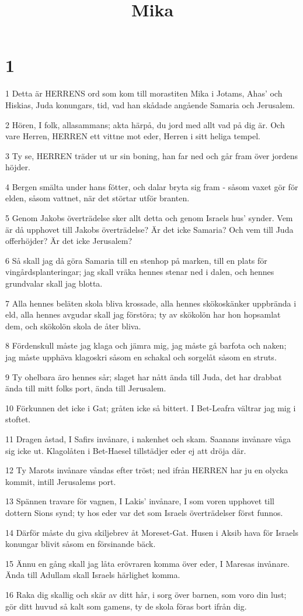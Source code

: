 

\title{Mika}


\chapter{1}

\par 1 Detta är HERRENS ord som kom till morastiten Mika i Jotams, Ahas' och Hiskias, Juda konungars, tid, vad han skådade angående Samaria och Jerusalem.
\par 2 Hören, I folk, allasammans; akta härpå, du jord med allt vad på dig är. Och vare Herren, HERREN ett vittne mot eder, Herren i sitt heliga tempel.
\par 3 Ty se, HERREN träder ut ur sin boning, han far ned och går fram över jordens höjder.
\par 4 Bergen smälta under hans fötter, och dalar bryta sig fram - såsom vaxet gör för elden, såsom vattnet, när det störtar utför branten.
\par 5 Genom Jakobs överträdelse sker allt detta och genom Israels hus' synder. Vem är då upphovet till Jakobs överträdelse? Är det icke Samaria? Och vem till Juda offerhöjder? Är det icke Jerusalem?
\par 6 Så skall jag då göra Samaria till en stenhop på marken, till en plats för vingårdsplanteringar; jag skall vräka hennes stenar ned i dalen, och hennes grundvalar skall jag blotta.
\par 7 Alla hennes beläten skola bliva krossade, alla hennes skökoskänker uppbrända i eld, alla hennes avgudar skall jag förstöra; ty av skökolön har hon hopsamlat dem, och skökolön skola de åter bliva.
\par 8 Fördenskull måste jag klaga och jämra mig, jag måste gå barfota och naken; jag måste upphäva klagoskri såsom en schakal och sorgelåt såsom en struts.
\par 9 Ty ohelbara äro hennes sår; slaget har nått ända till Juda, det har drabbat ända till mitt folks port, ända till Jerusalem.
\par 10 Förkunnen det icke i Gat; gråten icke så bittert. I Bet-Leafra vältrar jag mig i stoftet.
\par 11 Dragen åstad, I Safirs invånare, i nakenhet och skam. Saanans invånare våga sig icke ut. Klagolåten i Bet-Haesel tillstädjer eder ej att dröja där.
\par 12 Ty Marots invånare våndas efter tröst; ned ifrån HERREN har ju en olycka kommit, intill Jerusalems port.
\par 13 Spännen travare för vagnen, I Lakis' invånare, I som voren upphovet till dottern Sions synd; ty hos eder var det som Israels överträdelser först funnos.
\par 14 Därför måste du giva skiljebrev åt Moreset-Gat. Husen i Aksib hava för Israels konungar blivit såsom en försinande bäck.
\par 15 Ännu en gång skall jag låta erövraren komma över eder, I Maresas invånare. Ända till Adullam skall Israels härlighet komma.
\par 16 Raka dig skallig och skär av ditt hår, i sorg över barnen, som voro din lust; gör ditt huvud så kalt som gamens, ty de skola föras bort ifrån dig.

